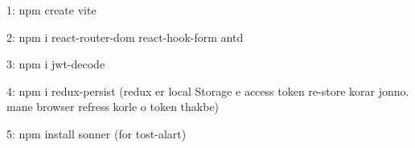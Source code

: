 1: npm create vite

2: npm i react-router-dom react-hook-form antd

3: npm i jwt-decode

4: npm i redux-persist (redux er local Storage e access token re-store korar jonno. mane browser refress korle o token thakbe)

5: npm install sonner (for tost-alart)